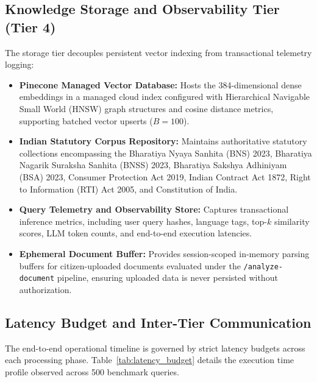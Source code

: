 \documentclass[12pt,a4paper]{report}
\begin{document}
\subsection{Knowledge Storage and Observability Tier (Tier 4)}
The storage tier decouples persistent vector indexing from transactional telemetry logging:
\begin{itemize}
    \item \textbf{Pinecone Managed Vector Database:} Hosts the 384-dimensional dense embeddings in a managed cloud index configured with Hierarchical Navigable Small World (HNSW) graph structures and cosine distance metrics, supporting batched vector upserts ($B = 100$).
    \item \textbf{Indian Statutory Corpus Repository:} Maintains authoritative statutory collections encompassing the Bharatiya Nyaya Sanhita (BNS) 2023, Bharatiya Nagarik Suraksha Sanhita (BNSS) 2023, Bharatiya Sakshya Adhiniyam (BSA) 2023, Consumer Protection Act 2019, Indian Contract Act 1872, Right to Information (RTI) Act 2005, and Constitution of India.
    \item \textbf{Query Telemetry and Observability Store:} Captures transactional inference metrics, including user query hashes, language tags, top-$k$ similarity scores, LLM token counts, and end-to-end execution latencies.
    \item \textbf{Ephemeral Document Buffer:} Provides session-scoped in-memory parsing buffers for citizen-uploaded documents evaluated under the \texttt{/analyze-document} pipeline, ensuring uploaded data is never persisted without authorization.
\end{itemize}

\subsection{Latency Budget and Inter-Tier Communication}
The end-to-end operational timeline is governed by strict latency budgets across each processing phase. Table~\ref{tab:latency_budget} details the execution time profile observed across 500 benchmark queries.
\end{document}
